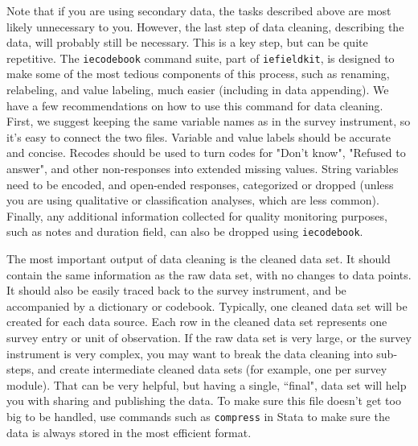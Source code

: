 Note that if you are using secondary data, 
the tasks described above are most likely unnecessary to you.
However, the last step of data cleaning, describing the data,
will probably still be necessary.
This is a key step, but can be quite repetitive.
The \texttt{iecodebook} command suite, part of \texttt{iefieldkit},
is designed to make some of the most tedious components of this process,
such as renaming, relabeling, and value labeling,
much easier (including in data appending).
We have a few recommendations on how to use this command for data cleaning.
First, we suggest keeping the same variable names as in the survey instrument,
so it's easy to connect the two files.
Variable and value labels should be accurate and concise.
Recodes should be used to turn codes for "Don't know", "Refused to answer", and
other non-responses into extended missing values.
String variables need to be encoded, and open-ended responses, categorized or dropped
(unless you are using qualitative or classification analyses, which are less common).
Finally, any additional information collected for quality monitoring purposes,
such as notes and duration field, can also be dropped using \texttt{iecodebook}.


The most important output of data cleaning is the cleaned data set. 
It should contain the same information as the raw data set,
with no changes to data points.
It should also be easily traced back to the survey instrument,
and be accompanied by a dictionary or codebook.
Typically, one cleaned data set will be created for each data source.
Each row in the cleaned data set represents one survey entry or unit of observation.
If the raw data set is very large, or the survey instrument is very complex,
you may want to break the data cleaning into sub-steps, 
and create intermediate cleaned data sets
(for example, one per survey module).
That can be very helpful, but having a single, ``final", data set
will help you with sharing and publishing the data.
To make sure this file doesn't get too big to be handled,
use commands such as \texttt{compress} in Stata to make sure the data
is always stored in the most efficient format.

